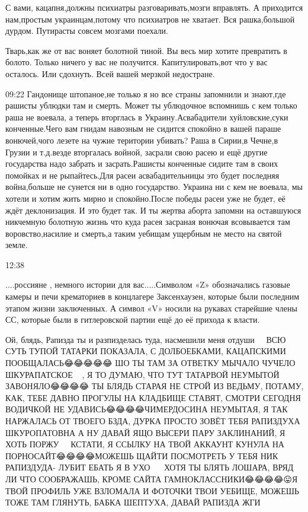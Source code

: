 {%

С вами, кацапня,должны психиатры разговаривать,мозги вправлять. А приходится
нам,простым украинцам,потому что психиатров не хватает. Вся рашка,большой
дурдом. Путирасты совсем мозгами поехали.

Тварь,как же от вас воняет болотной тиной. Вы весь мир хотите превратить в
болото. Только ничего у вас не получится. Капитулировать,вот что у вас
осталось. Или сдохнуть. Всей вашей мерзкой недостране.

09:22
Гандонище штопаное,не только я но все страны запомнили и знают,где рашисты ублюдки там и смерть. Может ты ублюдочное вспомнишь с кем только раша не воевала, а теперь вторглась в Украину.Асвабадители хуйловские,суки конченные.Чего вам гнидам навозным не сидится спокойно в вашей параше вонючей,чого лезете на чужие територии убивать? Раша в Сирии,в Чечне,в Грузии и т.д.везде вторгалась войной, засрали свою расею и ещё другие государства надо забрать и засрать.Рашисты конченные сидите там в своих помойках и не рыпайтесь.Для расеи асвабадительницы это будет последняя война,больше не сунется ни в одно государство.
Украина ни с кем не воевала, мы хотели и хотим жить мирно и спокойно.После победы расеи уже не будет, её ждёт деклонизация. И это будет так.
И ты жертва аборта запомни на оставшуюся никчемную болотную жизнь что куда расея засраная вонючая всовывается там воровство,насилие и смерть,а таким уебищам ущербным не место на святой земле.

12:38

....россияне , немного истории для вас.....Символом «Z» обозначались газовые
камеры и печи крематориев в концлагере Заксенхаузен, которые были последним
этапом жизни заключенных. А символ «V» носили на рукавах старейшие члены СС,
которые были в гитлеровской партии ещё до её прихода к власти.

Ой, блядь, Рапизда ты и разпизделась туда, насмешили меня отдуши🤣🤣🤣🤣🤣ВСЮ
СУТЬ ТУПОЙ ТАТАРКИ ПОКАЗАЛА, С ДОЛБОЕБКАМИ, КАЦАПСКИМИ ПООБЩАЛАСЬ😂😂😂😂😂 ШО
ТЫ ТАМ ЗА ОТВЕТКУ МЫЧАЛО ЧУЧЕЛО ШКУРАПАТСКОЕ🤣🤣🤣🤣, Я ТО ДУМАЮ, ЧТО ТУТ
ТАТАРВОЙ НЕУМЫТОЙ ЗАВОНЯЛО😂😂😂😂 ТЫ БЛЯДЬ СТАРАЯ НЕ СТРОЙ ИЗ ВЕДЬМУ, ПОТАМУ,
КАК, ТЕБЕ ДАВНО ПРОГУЛЫ НА КЛАДБИЩЕ СТАВЯТ, СМОТРИ СЕГОДНЯ ВОДИЧКОЙ НЕ
УДАВИСЬ😂😂😂😂ЧИМЕРДОСИНА НЕУМЫТАЯ, Я ТАК НАРЖАЛАСЬ ОТ ТВОЕГО БЗДА, ДУРКА
ПРОСТО ЗОВЁТ ТЕБЯ РАПИЗДУХА ШКУРОПАТОВНА А НУ ДАВАЙ ЯЩО ВЫСЕРИ ПАРУ ЗАКЛИНАНИЙ,
Я ХОТЬ ПОРЖУ🤣🤣🤣🤣🤣КСТАТИ, Я ССЫЛКУ НА ТВОЙ АККАУНТ КУНУЛА НА
ПОРНОСАЙТ😂😂😂😂МОЖЕШЬ ЩАЙТИ ПОСМОТРЕТЬ У ТЕБЯ НИК РАПИЗДУДА- ЛУБИТ ЕБАТЬ Я В
УХО🤣🤣🤣🤣🤣🤣ХОТЯ ТЫ БЛЯТЬ ЛОШАРА, ВРЯД ЛИ ЧТО СООБРАЖАШЬ, КРОМЕ САЙТА
ГАМНОКЛАССНИКИ😂😂😂😂😛Я ТВОЙ ПРОФИЛЬ УЖЕ ВЗЛОМАЛА И ФОТОЧКИ ТВОИ УЕБИЩЕ,
МОЖЕШЬ ТОЖЕ ТАМ ГЛЯНУТЬ, БАБКА ШЕПТУХА, ДАВАЙ РАПИЗДА ЖГИ🤣🤣🤣🤣🤣🤣

}
